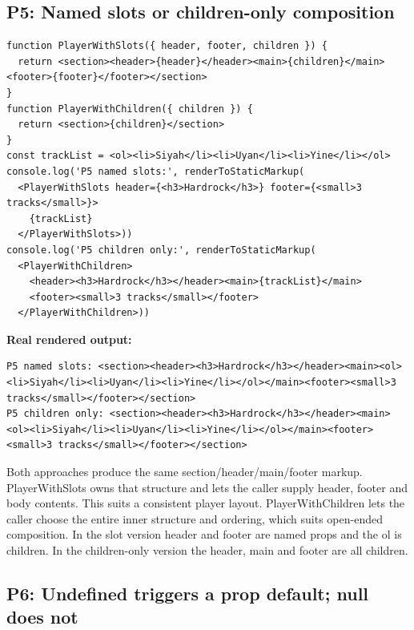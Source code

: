 \documentclass[
  10pt,
  a4paper,
  titlepage]{article}
\begin{document}
\subsection{P5: Named slots or children-only
composition}\label{p5-named-slots-or-children-only-composition}

\Needspace{82.4pt}
\begin{lstlisting}[language=JSX]
function PlayerWithSlots({ header, footer, children }) {
  return <section><header>{header}</header><main>{children}</main><footer>{footer}</footer></section>
}
function PlayerWithChildren({ children }) {
  return <section>{children}</section>
}
const trackList = <ol><li>Siyah</li><li>Uyan</li><li>Yine</li></ol>
console.log('P5 named slots:', renderToStaticMarkup(
  <PlayerWithSlots header={<h3>Hardrock</h3>} footer={<small>3 tracks</small>}>
    {trackList}
  </PlayerWithSlots>))
console.log('P5 children only:', renderToStaticMarkup(
  <PlayerWithChildren>
    <header><h3>Hardrock</h3></header><main>{trackList}</main>
    <footer><small>3 tracks</small></footer>
  </PlayerWithChildren>))
\end{lstlisting}


\textbf{Real rendered output:}

\Needspace{41.2pt}
\begin{lstlisting}
P5 named slots: <section><header><h3>Hardrock</h3></header><main><ol><li>Siyah</li><li>Uyan</li><li>Yine</li></ol></main><footer><small>3 tracks</small></footer></section>
P5 children only: <section><header><h3>Hardrock</h3></header><main><ol><li>Siyah</li><li>Uyan</li><li>Yine</li></ol></main><footer><small>3 tracks</small></footer></section>
\end{lstlisting}

Both approaches produce the same section/header/main/footer markup.
PlayerWithSlots owns that structure and lets the caller supply header,
footer and body contents. This suits a consistent player layout.
PlayerWithChildren lets the caller choose the entire inner structure and
ordering, which suits open-ended composition. In the slot version header
and footer are named props and the ol is children. In the children-only
version the header, main and footer are all children.

\subsection{P6: Undefined triggers a prop default; null does
not}\label{p6-undefined-triggers-a-prop-default-null-does-not}
\end{document}
